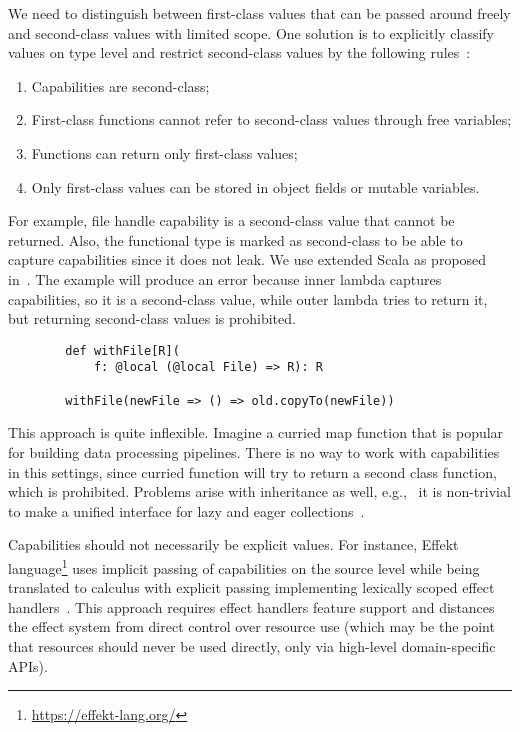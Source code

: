 \documentclass[conference]{IEEEtran}
\begin{document}
    We need to distinguish between first-class values that can be passed around freely and second-class values with limited scope.
    One solution is to explicitly classify values on type level and restrict second-class values by the following rules~\cite{osvald2016gentrification}:
    \begin{enumerate}
        \item Capabilities are second-class;
        \item First-class functions cannot refer to second-class values through free variables;
        \item Functions can return only first-class values;
        \item Only first-class values can be stored in object fields or mutable variables.
    \end{enumerate}

    For example, file handle capability is a second-class value that cannot be returned.
    Also, the functional type is marked as second-class to be able to capture capabilities since it does not leak.
    We use extended Scala as proposed in~\cite{osvald2016gentrification}.
    The example will produce an error because inner lambda captures capabilities, so it is a second-class value, while outer lambda tries to return it, but returning second-class values is prohibited.
    \begin{verbatim}
        def withFile[R](
            f: @local (@local File) => R): R

        withFile(newFile => () => old.copyTo(newFile))
    \end{verbatim}

    This approach is quite inflexible.
    Imagine a curried map function that is popular for building data processing pipelines.
    There is no way to work with capabilities in this settings, since curried function will try to return a second class function, which is prohibited.
    Problems arise with inheritance as well, e.g., \ it is non-trivial to make a unified interface for lazy and eager collections~\cite{osvald2016gentrification}.

    Capabilities should not necessarily be explicit values.
    For instance, Effekt language\footnote{\url{https://effekt-lang.org/}} uses implicit passing of capabilities on the source level while being translated to calculus with explicit passing implementing lexically scoped effect handlers~\cite{brachthauser2020effects}.
    This approach requires effect handlers feature support and distances the effect system from direct control over resource use (which may be the point that resources should never be used directly, only via high-level domain-specific APIs).
\end{document}
